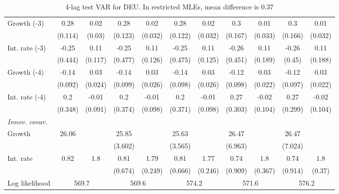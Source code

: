 \begin{table}[htbp]
\begin{tabular}{@{\extracolsep{4pt}}lcccccccccc@{}}
\quad Growth (-3) 	 &0.28 	 & 0.02 	 & 0.28 	 & 0.02 	 & 0.28 	 & 0.02 	 & 0.3 	 & 0.01 	 & 0.3 	 & 0.01	 \\ 
 		 & (0.114) 	 & (0.03) 	 & (0.123) 	 & (0.032) 	 & (0.122) 	 & (0.032) 	 & (0.167) 	 & (0.033) 	 & (0.166) 	 & (0.032) 	 \\ 
\quad Int. rate (-3) 	 &-0.25 	 & 0.11 	 & -0.25 	 & 0.11 	 & -0.25 	 & 0.11 	 & -0.26 	 & 0.11 	 & -0.26 	 & 0.11	 \\ 
 		 & (0.444) 	 & (0.117) 	 & (0.477) 	 & (0.126) 	 & (0.475) 	 & (0.125) 	 & (0.451) 	 & (0.189) 	 & (0.45) 	 & (0.188) 	 \\ 
\quad Growth (-4) 	 &-0.14 	 & 0.03 	 & -0.14 	 & 0.03 	 & -0.14 	 & 0.03 	 & -0.12 	 & 0.03 	 & -0.12 	 & 0.03	 \\ 
 		 & (0.092) 	 & (0.024) 	 & (0.099) 	 & (0.026) 	 & (0.098) 	 & (0.026) 	 & (0.098) 	 & (0.022) 	 & (0.097) 	 & (0.022) 	 \\ 
\quad Int. rate (-4) 	 &0.2 	 & -0.01 	 & 0.2 	 & -0.01 	 & 0.2 	 & -0.01 	 & 0.27 	 & -0.02 	 & 0.27 	 & -0.02	 \\ 
 		 & (0.348) 	 & (0.091) 	 & (0.374) 	 & (0.098) 	 & (0.371) 	 & (0.098) 	 & (0.303) 	 & (0.104) 	 & (0.299) 	 & (0.104) 	 \\ 
\rule{0pt}{4ex} \emph{Innov. covar.}  	 & 	 & 	 & 	 & 	 & 	 & 	 & 	 & 	 & 	 &\\ 
\quad Growth 	 &26.06 	 &  	 & 25.85 	 &  	 & 25.63 	 &  	 & 26.47 	 &  	 & 26.47 	 & 	 \\ 
 		 &  	 &  	 & (3.602) 	 &  	 & (3.565) 	 &  	 & (6.963) 	 &  	 & (7.024) 	 &  	 \\ 
\quad Int. rate 	 &0.82 	 & 1.8 	 & 0.81 	 & 1.79 	 & 0.81 	 & 1.77 	 & 0.74 	 & 1.8 	 & 0.74 	 & 1.8	 \\ 
 		 &  	 &  	 & (0.674) 	 & (0.249) 	 & (0.666) 	 & (0.246) 	 & (0.909) 	 & (0.367) 	 & (0.914) 	 & (0.37) 	 \\ 
 \hline \rule{0pt}{4ex} 
  Log likelihood 	 &\multicolumn{2}{c}{569.7} 	 & \multicolumn{2}{c}{569.6} 	 & \multicolumn{2}{c}{574.2} 	 & \multicolumn{2}{c}{571.6} 	 & \multicolumn{2}{c}{576.2}\\ 

 \hline 	\end{tabular}		\caption{4-lag test VAR for DEU. In restricted MLEs, mean difference is 0.37}
		\label{tab:DEU4}

\end{table}
